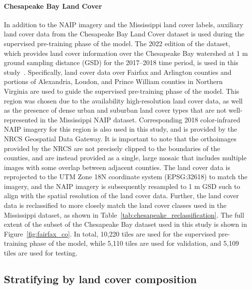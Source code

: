 

\paragraph{Chesapeake Bay Land Cover}

In addition to the NAIP imagery and the Mississippi land cover labels, auxiliary land cover data from the Chesapeake Bay Land Cover dataset is used during the supervised pre-training phase of the model.
The 2022 edition of the dataset, which provides land cover information over the Chesapeake Bay watershed at 1 m ground sampling distance (GSD) for the 2017--2018 time period, is used in this study~\cite{chesapeakebayprogramChesapeakeBayLand2023a}.
Specifically, land cover data over Fairfax and Arlington counties and portions of Alexandria, Loudon, and Prince William counties in Northern Virginia are used to guide the supervised pre-training phase of the model.
This region was chosen due to the availability high-resolution land cover data, as well as the presence of dense urban and suburban land cover types that are not well-represented in the Mississippi NAIP dataset.
Corresponding 2018 color-infrared NAIP imagery for this region is also used in this study, and is provided by the NRCS Geospatial Data Gateway.
It is important to note that the orthoimages provided by the NRCS are not precisely clipped to the boundaries of the counties, and are instead provided as a single, large mosaic that includes multiple images with some overlap between adjacent counties.
The land cover data is reprojected to the UTM Zone 18N coordinate system (EPSG:\@32618) to match the imagery, and the NAIP imagery is subsequently resampled to 1 m GSD such to align with the spatial resolution of the land cover data.
Further, the land cover data is reclassified to more closely match the land cover classes used in the Mississippi dataset, as shown in Table~\ref{tab:chesapeake_reclassification}.
The full extent of the subset of the Chesapeake Bay dataset used in this study is shown in Figure~\ref{fig:fairfax_co}.
In total, 10,220 tiles are used for the supervised pre-training phase of the model, while 5,110 tiles are used for validation, and 5,109 tiles are used for testing.






\subsection{Stratifying by land cover composition}

